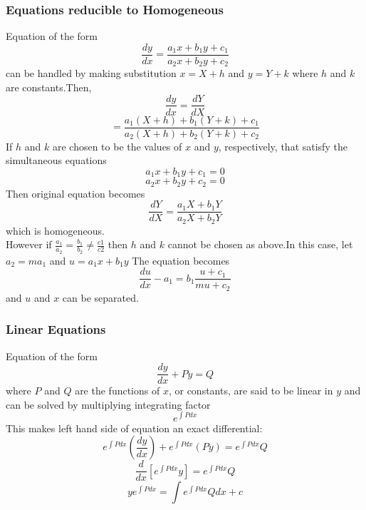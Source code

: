 \documentclass[twocolumn, 10pt]{article}
\begin{document}
\subsubsection{Equations reducible to Homogeneous}
Equation of the form  $$\frac{dy}{dx}=\frac{a_1x+b_1y+c_1}{a_2x+b_2y+c_2}$$ can be handled by making substitution $x=X+h$
and $y=Y+k$ where $h$ and $k$ are constants.Then, $$\frac{dy}{dx}=\frac{dY}{dX}$$ $$=\frac{a_1(X+h)+b_1(Y+k)+c_1}{a_2(X+h)+b_2(Y+k)+c_2}$$
If $h$ and $k$ are chosen to be the values of $x$ and $y$, respectively, that satisfy the simultaneous equations
$$a_1x+b_1y+c_1=0$$
$$a_2x+b_2y+c_2=0$$
Then original equation becomes $$\frac{dY}{dX}=\frac{a_1X+b_1Y}{a_2X+b_2Y}$$ which is homogeneous. \\
However if $\frac{a_1}{a_2}=\frac{b_1}{b_2} \not= \frac{c1}{c2}$ then $h$ and $k$ cannot be chosen as above.In this case, let $a_2=ma_1$ and $u=a_1x+b_1y$ The equation becomes $$\frac{du}{dx}-a_1=b_1 \frac{u+c_1}{mu+c_2}$$ and $u$ and $x$ can be separated.
\subsubsection{Linear Equations}
Equation of the form $$\frac{dy}{dx}+Py=Q$$ where $P$ and $Q$ are the functions of $x$, or constants, are said to be linear in $y$ and can be solved by multiplying integrating factor $$e^{\int Pdx}$$This makes left hand side of equation an exact differential:
$$e^{\int Pdx}(\frac{dy}{dx})+e^{\int Pdx}(Py)=e^{\int Pdx}Q$$
$$\frac{d}{dx}[e^{\int Pdx}y]=e^{\int Pdx}Q$$
$$ye^{\int Pdx}=\int e^{\int Pdx}Qdx+c$$
\end{document}
